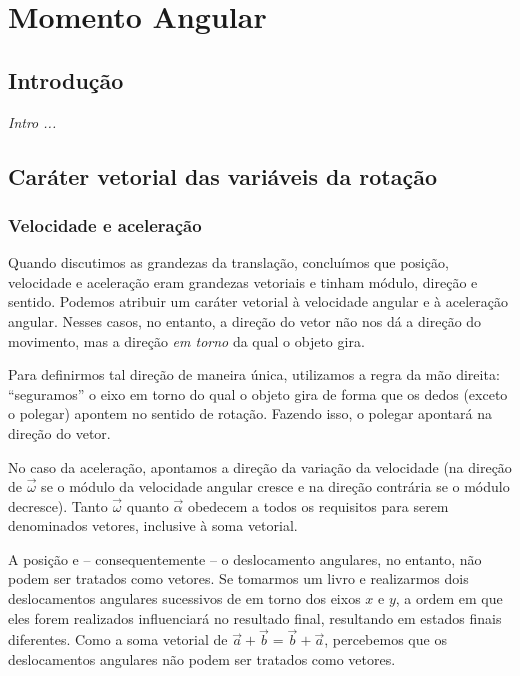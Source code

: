 \chapter{Momento Angular}
\label{Chap:MomentoAngular}
\minitoc

\clearpage

\section{Introdução}

{\it
Intro ...
}

\section{Caráter vetorial das variáveis da rotação}

\subsection{Velocidade e aceleração}

Quando discutimos as grandezas da translação, concluímos que posição, velocidade e aceleração eram grandezas vetoriais e tinham módulo, direção e sentido. Podemos atribuir um caráter vetorial à velocidade angular e à aceleração angular. Nesses casos, no entanto, a direção do vetor não nos dá a direção do movimento, mas a direção \emph{em torno} da qual o objeto gira.

Para definirmos tal direção de maneira única, utilizamos a regra da mão direita: ``seguramos'' o eixo em torno do qual o objeto gira de forma que os dedos (exceto o polegar) apontem no sentido de rotação. Fazendo isso, o polegar apontará na direção do vetor.

No caso da aceleração, apontamos a direção da variação da velocidade (na direção de $\vec{\omega}$ se o módulo da velocidade angular cresce e na direção contrária se o módulo decresce). Tanto $\vec{\omega}$ quanto $\vec{\alpha}$ obedecem a todos os requisitos para serem denominados vetores, inclusive à soma vetorial.

A posição e -- consequentemente -- o deslocamento angulares, no entanto, não podem ser tratados como vetores. Se tomarmos um livro e realizarmos dois deslocamentos angulares sucessivos de  em torno dos eixos $x$ e $y$, a ordem em que eles forem realizados influenciará no resultado final, resultando em estados finais diferentes. Como a soma vetorial de $\vec{a} + \vec{b} = \vec{b} + \vec{a}$, percebemos que os deslocamentos angulares não podem ser tratados como vetores.

